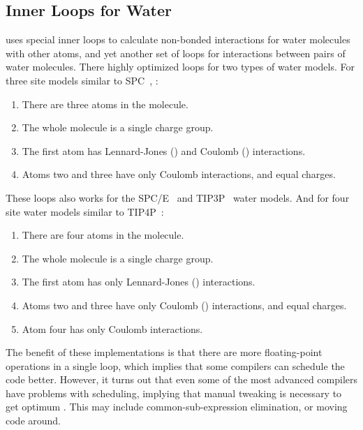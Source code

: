 \subsection{Inner Loops for Water}
\label{sec:waterloops}
{\gromacs} uses special inner loops to calculate non-bonded
interactions for water molecules with other atoms, and yet
another set of loops for interactions between pairs of
water molecules. There highly optimized loops for two types of water models.
For three site models similar to
SPC~\cite{Berendsen81}, {\ie}:
\begin{enumerate}
\item   There are three atoms in the molecule.
\item   The whole molecule is a single charge group.
\item   The first atom has Lennard-Jones () and 
        Coulomb () interactions.
\item   Atoms two and three have only Coulomb interactions, 
        and equal charges.
\end{enumerate}
These loops also works for the SPC/E~\cite{Berendsen87} and 
TIP3P~\cite{Jorgensen83} water models.
And for four site water models similar to TIP4P~\cite{Jorgensen83}:
\begin{enumerate}
\item   There are four atoms in the molecule.
\item   The whole molecule is a single charge group.
\item   The first atom has only Lennard-Jones () interactions.
\item   Atoms two and three have only Coulomb () interactions, 
        and equal charges.
\item   Atom four has only Coulomb interactions.
\end{enumerate}

The benefit of these implementations is that there are more floating-point
operations in a single loop, which implies that some compilers
can schedule the code better. However, it turns out that even
some of the most advanced compilers have problems with scheduling, 
implying that manual tweaking is necessary to get optimum 
.
This may include common-sub-expression elimination, or moving
code around. 


